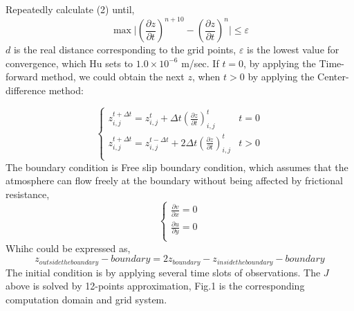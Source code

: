 \documentclass{article}
\begin{document}
\noindent Repeatedly calculate (2) until,\newline
\begin{equation}
    \max\lvert(\frac{\partial{z}}{\partial{t}})^{n+10}-(\frac{\partial{z}}{\partial{t}})^{n}\rvert\leq\varepsilon
\end{equation}
$d$ is the real distance corresponding to the grid points, $\varepsilon$ is the lowest value for convergence, which Hu sets to $1.0\times10^{-6}$ m/sec. If $t=0$, by applying the Time-forward method, we could obtain the next $z$,
when $t>0$ by applying the Center-difference method:

\begin{equation}
    \begin{cases}
        z^{t+\Delta{t}}_{i,j}=z^{t}_{i,j}+\Delta{t}(\frac{\partial{z}}{\partial{t}})^{t}_{i,j}& t=0 \\
        z^{t+\Delta{t}}_{i,j}=z^{t-\Delta{t}}_{i,j}+2\Delta{t}(\frac{\partial{z}}{\partial{t}})^{t}_{i,j}& t>0 \\
    \end{cases}
\end{equation}
The boundary condition is Free slip boundary condition, which assumes that the atmosphere can flow freely at the boundary without being affected by frictional resistance, \newline
\begin{equation}
    \begin{cases}
        \frac{\partial v}{\partial x}=0 \\
        \frac{\partial u}{\partial y}=0 \\
    \end{cases}
\end{equation}
Whihc could be expressed as, \newline
\begin{equation}
    z_{outside the boundary}-boundary = 2z_{boundary} - z_{inside the boundary}-boundary
\end{equation}
The initial condition is by applying several time slots of observations.
The $J$ above is solved by 12-points approximation, Fig.1 is the corresponding computation domain and grid system. \newline
\end{document}
